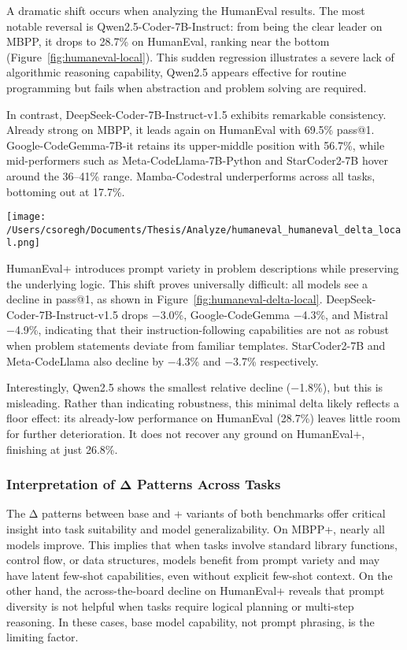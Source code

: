 A dramatic shift occurs when analyzing the HumanEval results. The most notable reversal is Qwen2.5-Coder-7B-Instruct: from being the clear leader on MBPP, it drops to 28.7\% on HumanEval, ranking near the bottom (Figure~\ref{fig:humaneval-local}). This sudden regression illustrates a severe lack of algorithmic reasoning capability, Qwen2.5 appears effective for routine programming but fails when abstraction and problem solving are required.

In contrast, DeepSeek-Coder-7B-Instruct-v1.5 exhibits remarkable consistency. Already strong on MBPP, it leads again on HumanEval with 69.5\% pass@1. Google-CodeGemma-7B-it retains its upper-middle position with 56.7\%, while mid-performers such as Meta-CodeLlama-7B-Python and StarCoder2-7B hover around the 36--41\% range. Mamba-Codestral underperforms across all tasks, bottoming out at 17.7\%.

\begin{center}
	\texttt{[image: /Users/csoregh/Documents/Thesis/Analyze/humaneval\_humaneval\_delta\_local.png]}
	\label{fig:humaneval-delta-local}
\end{center}

HumanEval+ introduces prompt variety in problem descriptions while preserving the underlying logic. This shift proves universally difficult: all models see a decline in pass@1, as shown in Figure~\ref{fig:humaneval-delta-local}. DeepSeek-Coder-7B-Instruct-v1.5 drops −3.0\%, Google-CodeGemma −4.3\%, and Mistral −4.9\%, indicating that their instruction-following capabilities are not as robust when problem statements deviate from familiar templates. StarCoder2-7B and Meta-CodeLlama also decline by −4.3\% and −3.7\% respectively.

Interestingly, Qwen2.5 shows the smallest relative decline (−1.8\%), but this is misleading. Rather than indicating robustness, this minimal delta likely reflects a floor effect: its already-low performance on HumanEval (28.7\%) leaves little room for further deterioration. It does not recover any ground on HumanEval+, finishing at just 26.8\%.

\subsubsection*{Interpretation of Δ Patterns Across Tasks}

The Δ patterns between base and + variants of both benchmarks offer critical insight into task suitability and model generalizability. On MBPP+, nearly all models improve. This implies that when tasks involve standard library functions, control flow, or data structures, models benefit from prompt variety and may have latent few-shot capabilities, even without explicit few-shot context. On the other hand, the across-the-board decline on HumanEval+ reveals that prompt diversity is not helpful when tasks require logical planning or multi-step reasoning. In these cases, base model capability, not prompt phrasing, is the limiting factor.


